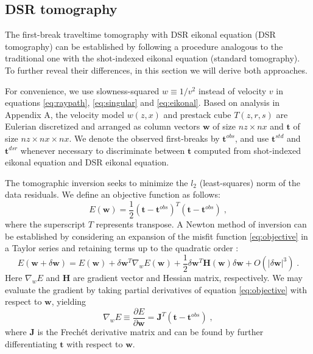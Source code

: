 \subsection{DSR tomography}

The first-break traveltime tomography with DSR eikonal equation (DSR tomography) can be established by following 
a procedure analogous to the traditional one with the shot-indexed eikonal equation (standard tomography). 
To further reveal their differences, in this section we will derive both approaches.

For convenience, we use slowness-squared $w \equiv 1/v^2$ instead of velocity $v$ in equations \ref{eq:raypath}, 
\ref{eq:singular} and \ref{eq:eikonal}. Based on analysis in Appendix A, the velocity model $w (z,x)$ and 
prestack cube $T (z,r,s)$ are Eulerian discretized and arranged as column vectors $\mathbf{w}$ of size 
$nz \times nx$ and $\mathbf{t}$ of size $nz \times nx \times nx$. We denote the observed first-breaks by 
$\mathbf{t}^{obs}$, and use $\mathbf{t}^{std}$ and $\mathbf{t}^{dsr}$ whenever necessary to discriminate between 
$\mathbf{t}$ computed from shot-indexed eikonal equation and DSR eikonal equation.

The tomographic inversion seeks to minimize the $l_2$ (least-squares) norm of the data residuals. We define 
an objective function as follows: 
\begin{equation}
\label{eq:objective}
E (\mathbf{w}) = \frac{1}{2} (\mathbf{t}-\mathbf{t}^{obs})^T (\mathbf{t}-\mathbf{t}^{obs})\;,
\end{equation}
where the superscript $T$ represents transpose. A Newton method of inversion can be established by considering an 
expansion of the misfit function \ref{eq:objective} in a Taylor series and retaining terms up to the 
quadratic order \cite[]{bertsekas}:
\begin{equation}
\label{eq:taylor}
E (\mathbf{w} + \delta \mathbf{w}) = E (\mathbf{w}) +
\delta \mathbf{w}^T \nabla_w E (\mathbf{w}) + 
\frac{1}{2} \delta \mathbf{w}^T \mathbf{H} (\mathbf{w}) \delta \mathbf{w} +
O (|\delta \mathbf{w}|^3)\;.
\end{equation}
Here $\nabla_w E$ and $\mathbf{H}$ are gradient vector and Hessian matrix, respectively. We may 
evaluate the gradient by taking partial derivatives of equation \ref{eq:objective} with respect to 
$\mathbf{w}$, yielding
\begin{equation}
\label{eq:linear}
\nabla_w E \equiv \frac{\partial E}{\partial \mathbf{w}} = 
\mathbf{J}^T (\mathbf{t} - \mathbf{t}^{obs})\;,
\end{equation}
where $\mathbf{J}$ is the Frech\'{e}t derivative matrix and 
can be found by further differentiating $\mathbf{t}$ with respect to $\mathbf{w}$. 

